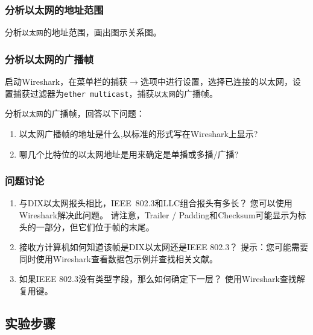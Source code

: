 \documentclass{article}
\begin{document}
\subsubsection{分析以太网的地址范围}

分析\texttt{以太网}的地址范围，画出图示关系图。

\subsubsection{分析以太网的广播帧}

启动Wireshark，在菜单栏的捕获\(\to \)选项中进行设置，选择已连接的以太网，设置捕获过滤器为\texttt{ether multicast}，捕获\texttt{以太网}的广播帧。

分析\texttt{以太网}的广播帧，回答以下问题：

\begin{enumerate}[noitemsep]
  \item 以太网广播帧的地址是什么,以标准的形式写在Wireshark上显示?
  \item 哪几个比特位的以太网地址是用来确定是单播或多播/广播?
\end{enumerate}

\subsubsection{问题讨论}

\begin{enumerate}[noitemsep]
  \item 与DIX以太网报头相比，IEEE 802.3和LLC组合报头有多长？
  您可以使用Wireshark解决此问题。 请注意，Trailer / Padding和Checksum可能显示为标头的一部分，但它们位于帧的末尾。
  
  \item 接收方计算机如何知道该帧是DIX以太网还是IEEE 802.3？ 提示：您可能需要同时使用Wireshark查看数据包示例并查找相关文献。
  
  \item 如果IEEE 802.3没有类型字段，那么如何确定下一层？ 使用Wireshark查找解复用键。
\end{enumerate}


\subsection{实验步骤}
\end{document}
